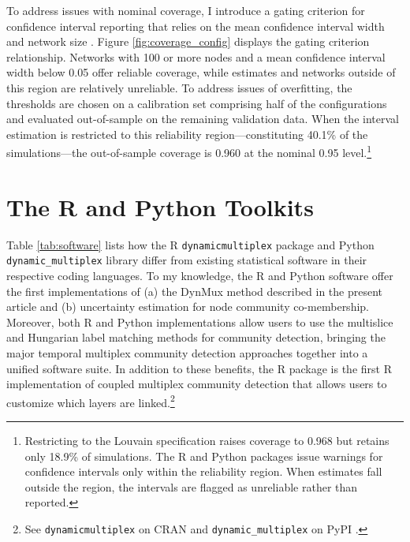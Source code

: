 \documentclass[11pt, letterpaper]{article}
\begin{document}
To address issues with nominal coverage, I introduce a gating criterion for confidence interval reporting that relies on the mean confidence interval width and network size \citep[see][for examples of gating]{chow1970optimum, king2006dangers}. Figure \ref{fig:coverage_config} displays the gating criterion relationship. Networks with 100 or more nodes and a mean confidence interval width below 0.05 offer reliable coverage, while estimates and networks outside of this region are relatively unreliable. To address issues of overfitting, the thresholds are chosen on a calibration set comprising half of the configurations and evaluated out-of-sample on the remaining validation data. When the interval estimation is restricted to this reliability region---constituting 40.1\% of the simulations---the out-of-sample coverage is 0.960 at the nominal 0.95 level.\footnote{Restricting to the Louvain specification raises coverage to 0.968 but retains only 18.9\% of simulations. The R and Python packages issue warnings for confidence intervals only within the reliability region. When estimates fall outside the region, the intervals are flagged as unreliable rather than reported.}


\section{The R and Python Toolkits}
Table \ref{tab:software} lists how the R \texttt{dynamicmultiplex} package and Python \texttt{dynamic\_multiplex} library differ from existing statistical software in their respective coding languages. To my knowledge, the R and Python software offer the first implementations of (a) the DynMux method described in the present article and (b) uncertainty estimation for node community co-membership. Moreover, both R and Python implementations allow users to use the multislice and Hungarian label matching methods for community detection, bringing the major temporal multiplex community detection approaches together into a unified software suite. In addition to these benefits, the R package is the first R implementation of coupled multiplex community detection that allows users to customize which layers are linked.\footnote{See \texttt{dynamicmultiplex} on CRAN \citep{dynamicmultiplexR} and \texttt{dynamic\_multiplex} on PyPI \citep{dynamicmultiplexPy}.}
\end{document}
